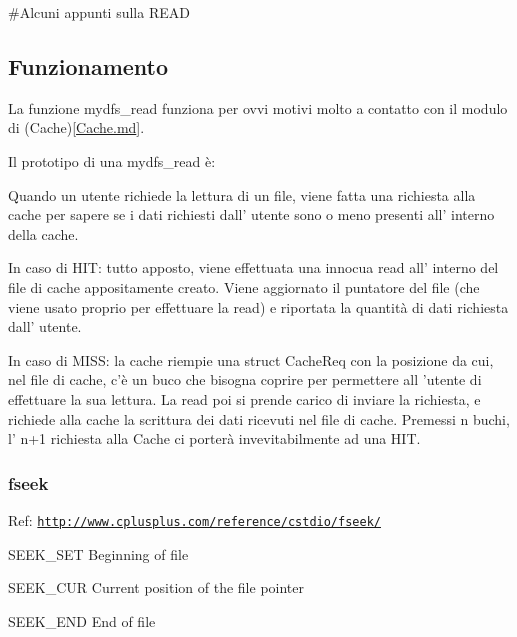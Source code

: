 \#\+Alcuni appunti sulla R\+E\+A\+D \subsection*{Funzionamento}

La funzione mydfs\+\_\+read funziona per ovvi motivi molto a contatto con il modulo di (Cache)\mbox{[}\hyperlink{Cache_8md}{Cache.\+md}\mbox{]}.

Il prototipo di una mydfs\+\_\+read è\+:

Quando un utente richiede la lettura di un file, viene fatta una richiesta alla cache per sapere se i dati richiesti dall' utente sono o meno presenti all' interno della cache.
\begin{DoxyItemize}
\item In caso di H\+I\+T\+: tutto apposto, viene effettuata una innocua read all' interno del file di cache appositamente creato. Viene aggiornato il puntatore del file (che viene usato proprio per effettuare la read) e riportata la quantità di dati richiesta dall' utente.
\item In caso di M\+I\+S\+S\+: la cache riempie una struct Cache\+Req con la posizione da cui, nel file di cache, c'è un buco che bisogna coprire per permettere all 'utente di effettuare la sua lettura. La read poi si prende carico di inviare la richiesta, e richiede alla cache la scrittura dei dati ricevuti nel file di cache. Premessi n buchi, l' n+1 richiesta alla Cache ci porterà invevitabilmente ad una H\+I\+T.
\end{DoxyItemize}

\subsubsection*{fseek}

Ref\+: \href{http://www.cplusplus.com/reference/cstdio/fseek/}{\tt http\+://www.\+cplusplus.\+com/reference/cstdio/fseek/}


\begin{DoxyItemize}
\item S\+E\+E\+K\+\_\+\+S\+E\+T Beginning of file
\item S\+E\+E\+K\+\_\+\+C\+U\+R Current position of the file pointer
\item S\+E\+E\+K\+\_\+\+E\+N\+D End of file 
\end{DoxyItemize}